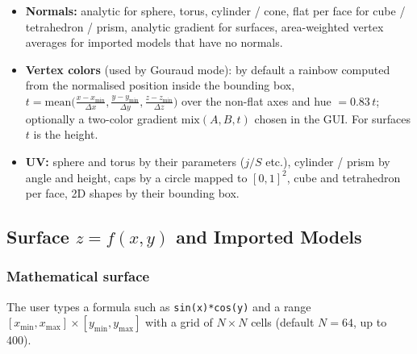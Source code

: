 \documentclass[a4paper, 11pt]{article}
\newcommand{\code}[1]{\texttt{#1}}
\begin{document}
\begin{itemize}
  \item \textbf{Normals:} analytic for sphere, torus, cylinder / cone, flat per face for cube / tetrahedron / prism, analytic gradient for surfaces,
        area-weighted vertex averages for imported models that have no normals.
  \item \textbf{Vertex colors} (used by Gouraud mode): by default a rainbow computed from the normalised position inside the bounding box,
        $t=\text{mean}\bigl(\tfrac{x-x_{\min}}{\Delta x},\tfrac{y-y_{\min}}{\Delta y},\tfrac{z-z_{\min}}{\Delta z}\bigr)$ over the non-flat axes and
        hue $=0.83\,t$; optionally a two-color gradient $\mathrm{mix}(A,B,t)$ chosen in the GUI. For surfaces $t$ is the height.
  \item \textbf{UV:} sphere and torus by their parameters ($j/S$ etc.), cylinder / prism by angle and height, caps by a circle mapped to $[0,1]^2$,
        cube and tetrahedron per face, 2D shapes by their bounding box.
\end{itemize}

\subsection{Surface $z=f(x,y)$ and Imported Models}

\subsubsection{Mathematical surface}\label{sec:surface}

The user types a formula such as \code{sin(x)*cos(y)} and a range $[x_{\min},x_{\max}]\times[y_{\min},y_{\max}]$ with a grid of
$N\times N$ cells (default $N=64$, up to 400).
\end{document}

